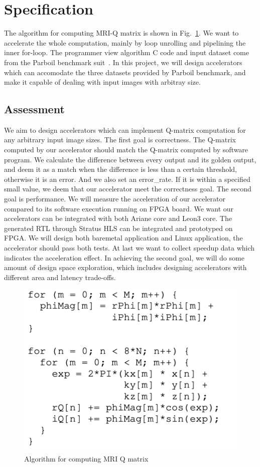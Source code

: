 \section{Specification}
The algorithm for computing MRI-Q matrix is shown in Fig.~\ref{fig-1}. We want to accelerate the whole computation, mainly by loop unrolling and pipelining the inner for-loop. The programmer view algorithm C code and input dataset come from the Parboil benchmark suit~\cite{Rub1}. In this project, we will design accelerators which can accomodate the three datasets provided by Parboil benchmark, and make it capable of dealing with input images with arbitray size.


\subsection{Assessment}
We aim to design accelerators which can implement Q-matrix computation for any arbitrary input image sizes. The first goal is correctness. The Q-matrix computed by our accelerator should match the Q-matrix computed by software program. We calculate the difference between every output and its golden output, and deem it as a match when the difference is less than a certain threshold, otherwise it is an error. And we also set an error\_rate. If it is within a specified small value, we deem that our accelerator meet the correctness goal. The second goal is performance. We will measure the acceleration of our accelerator compared to its software execution running on FPGA board. We want our accelerators can be integrated with both Ariane core and Leon3 core. The generated RTL through Stratus HLS can be integrated and prototyped on FPGA. We will design both baremetal application and Linux application, the accelerator should pass both tests. At last we want to collect speedup data which indicates the acceleration effect. In achieving the second goal, we will do some amount of design space exploration, which includes designing accelerators with different area and latency trade-offs. 
\begin{figure}[t]
\centering
\captionsetup{justification=centering, format=hang}
\includegraphics[width=0.85\columnwidth]{figures/algorithm-proposal.png}
\caption{Algorithm for computing MRI Q matrix~\cite{stone2008accelerating}}
\label{fig-1}
\end{figure}

